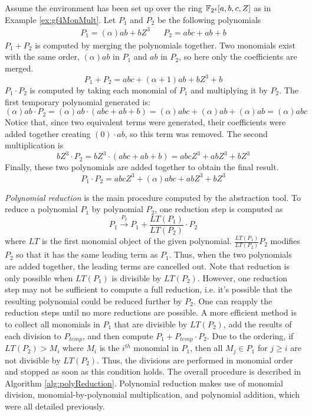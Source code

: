 \begin{Example}
\label{ex:polyMultAdd}
Assume the environment has been set up over the ring ${\mathbb{F}}_{2^4}[a,b,c,Z]$ as in
Example \ref{ex:gf4MonMult}. Let $P_1$ and $P_2$ be the following polynomials
\begin{eqnarray}
P_1=(\alpha) ab +bZ^3 && P_2=abc+ab+b
\end{eqnarray}
$P_1+P_2$ is computed by merging the polynomials together. Two monomials exist
with the same order, $(\alpha) a b$ in $P_1$ and $ab$ in $P_2$, so here only the
coefficients are merged.
\begin{equation}
P_1+P_2 = abc + (\alpha+1)ab + bZ^3+b
\end{equation}
$P_1 \cdot P_2$ is computed by taking each monomial of $P_1$ and multiplying it
by $P_2$. The first temporary polynomial generated is:
\begin{equation}
(\alpha)ab \cdot P_2 = (\alpha)ab \cdot (abc+ab+b) = (\alpha)abc+(\alpha)ab+(\alpha)ab=(\alpha)abc
\end{equation}
Notice that, since two equivalent terms were generated, their coefficients were
added together creating $(0)\cdot ab$, so this term was removed. The second
multiplication is
\begin{equation}
bZ^3 \cdot P_2 = bZ^3\cdot(abc+ab+b) = abcZ^3+abZ^3+bZ^3
\end{equation}
Finally, these two polynomials are added together to obtain the final result.
\begin{equation}
P_1\cdot P_2 = abcZ^3+(\alpha)abc+abZ^3+bZ^3
\end{equation}
\end{Example}

{\it Polynomial reduction} is the main procedure computed by the abstraction tool.
To reduce a polynomial $P_1$ by polynomial $P_2$, one reduction step
is computed as
\begin{equation}
P_1\stackrel{P_2}{\textstyle\longrightarrow} P_1 + \frac{LT(P_1)}{LT(P_2)} \cdot P_2
\end{equation}
where $LT$ is the first monomial object of the given polynomial. $\frac{LT(P_1)}{LT(P_2)} P_2$ 
modifies $P_2$ so that it has the same leading term as $P_1$. Thus, when the two 
polynomials are added together, the leading terms are cancelled out. Note that reduction
is only possible when $LT(P_1)$ is divisible by $LT(P_2)$.
However, one reduction step
may not be sufficient to compute a full reduction, i.e. it's possible that the 
resulting polynomial could be reduced further by $P_2$. 
One can reapply the reduction steps until no more reductions are possible.
A more efficient method is to collect all monomials in $P_1$ that are divisible
by $LT(P_2)$, add the results of each division to $P_{temp}$, and then compute
$P_1+P_{temp}\cdot P_2$. 
Due to the ordering, if $LT(P_2) > M_i$ where $M_i$ is the $i^{th}$ monomial in $P_1$, 
then all $M_j \in P_1$ for $j \geq i$ are not divisible by $LT(P_2)$. 
Thus, the divisions are performed in monomial order 
and stopped as soon as this condition holds. The overall procedure is described in 
Algorithm \ref{alg:polyReduction}. Polynomial reduction makes use of 
monomial division, monomial-by-polynomial multiplication,
and polynomial addition, which were all detailed previously.

